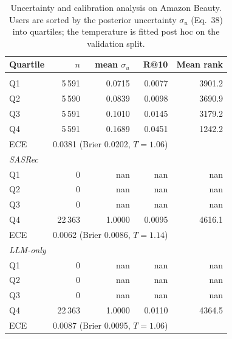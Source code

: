 \begin{table}[t]
\centering
\caption{Uncertainty and calibration analysis on Amazon Beauty. Users are sorted by the posterior uncertainty $\sigma_u$ (Eq.~38) into quartiles; the temperature is fitted post hoc on the validation split.}
\label{tab:calibration}
\small
\begin{tabular}{lrrrr}
\toprule
Quartile & $n$ & mean $\sigma_u$ & R@10 & Mean rank \\
\midrule
\multicolumn{5}{l}{\textit{\model{}}} \\
\quad Q1 & 5\,591 & 0.0715 & 0.0077 & 3901.2 \\
\quad Q2 & 5\,590 & 0.0839 & 0.0098 & 3690.9 \\
\quad Q3 & 5\,591 & 0.1010 & 0.0145 & 3179.2 \\
\quad Q4 & 5\,591 & 0.1689 & 0.0451 & 1242.2 \\
\quad ECE & \multicolumn{3}{l}{0.0381 (Brier 0.0202, $T=1.06$)} \\
\multicolumn{5}{l}{\textit{SASRec}} \\
\quad Q1 & 0 & nan & nan & nan \\
\quad Q2 & 0 & nan & nan & nan \\
\quad Q3 & 0 & nan & nan & nan \\
\quad Q4 & 22\,363 & 1.0000 & 0.0095 & 4616.1 \\
\quad ECE & \multicolumn{3}{l}{0.0062 (Brier 0.0086, $T=1.14$)} \\
\multicolumn{5}{l}{\textit{LLM-only}} \\
\quad Q1 & 0 & nan & nan & nan \\
\quad Q2 & 0 & nan & nan & nan \\
\quad Q3 & 0 & nan & nan & nan \\
\quad Q4 & 22\,363 & 1.0000 & 0.0110 & 4364.5 \\
\quad ECE & \multicolumn{3}{l}{0.0087 (Brier 0.0095, $T=1.06$)} \\
\bottomrule
\end{tabular}
\end{table}
